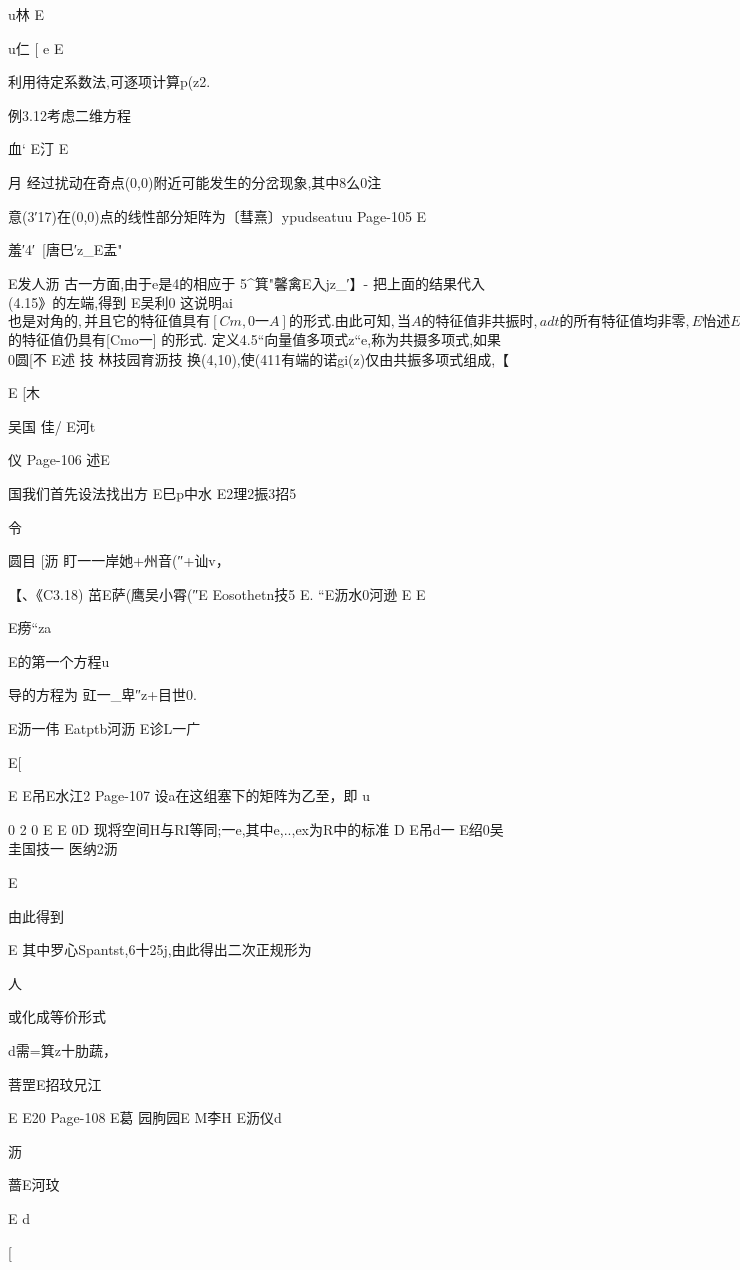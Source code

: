 {{u林
E

u仁
[
e
E

利用待定系数法,可逐项计算p(z2.

例3.12考虑二维方程

血`
E汀
E

月
经过扰动在奇点(0,0)附近可能发生的分岔现象,其中8么0注

意(3′17)在(0,0)点的线性部分矩阵为〔彗熹〕ypudseatuu
Page-105
E

羞′4′~[唐巳′z_E盂"

E发人沥
古一方面,由于e是4的相应于%
5^箕"馨禽E入jz_′】-
把上面的结果代入(4.15》的左端,得到
E吴利0
这说明ai$也是对角的,并且它的特征值具有[Cm,0一A]的形
式.由此可知,当A的特征值非共振时,adt的所有特征值均非零,
E怡述
Ea
ad也有相应的Jordan坡,并且ad$的特征值仍具有[Cmo一]
的形式.
定义4.5“向量值多项式z“e,称为共摄多项式,如果
0圆[不
E述
技
林技园育沥技
换(4,10),使(411有端的诺gi(z)仅由共振多项式组成,【

E
[木

吴国
佳/
E河t

仪
Page-106
述E

国我们首先设法找出方
E巳p中水
E2理2振3招5

令

圆目
[沥
盯一一岸她+州音(″+讪v，

【、《C3.18)
茁E萨(鹰吴小霄(″E
Eosothetn技5
E.
“E沥水0河逊
E
E

E痨“za

E的第一个方程u

导的方程为
豇一_卑″z+目世0.

E沥一伟
Eatptb河沥
E诊L一广

E[

E
E吊E水江2
Page-107
设a在这组塞下的矩阵为乙至，即
u

0
2
0
E
E
0D
现将空间H与RI等同;一e,其中e,..,ex为R中的标准
D
E吊d一
E绍0吴圭国技一
医纳2沥

E

由此得到

E
其中罗心Spantst,6十25j,由此得出二次正规形为

人

或化成等价形式

d需=箕z十肋蔬，

菩罡E招玟兄江

E
E20
Page-108
E葛
园朐园E
M李H
E沥仪d

沥

蔷E河玟

E
d

[

}}
